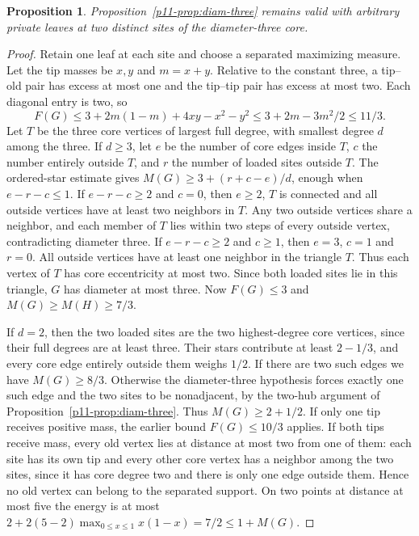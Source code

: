 \documentclass[11pt,a4paper]{article}
\newtheorem{proposition}[theorem]{Proposition}
\begin{document}
\begin{proposition}\label{p11-prop:diam-three-two}
Proposition~\ref{p11-prop:diam-three} remains valid with arbitrary
private leaves at two distinct sites of the diameter-three core.
\end{proposition}
\begin{proof}
Retain one leaf at each site and choose a separated maximizing measure.
Let the tip masses be $x,y$ and $m=x+y$. Relative to the constant
three, a tip--old pair has excess at most one and the tip--tip pair
has excess at most two. Each diagonal entry is two, so
\[
 F(G)\le3+2m(1-m)+4xy-x^2-y^2
      \le3+2m-3m^2/2\le11/3.
\]
Let $T$ be the three core vertices of largest full degree, with smallest
degree $d$ among the three. If $d\ge3$, let $e$ be the number of core
edges inside $T$, $c$ the number entirely outside $T$, and $r$ the
number of loaded sites outside $T$. The ordered-star estimate gives
$M(G)\ge3+(r+c-e)/d$, enough when $e-r-c\le1$.
If $e-r-c\ge2$ and $c=0$, then $e\ge2$, $T$ is connected and
all outside vertices have at least two neighbors in $T$. Any two
outside vertices share a neighbor, and each member of $T$ lies within
two steps of every outside vertex, contradicting diameter three.
If $e-r-c\ge2$ and $c\ge1$, then $e=3$, $c=1$ and $r=0$.
All outside vertices have at least one neighbor in the triangle $T$.
Thus each vertex of $T$ has core eccentricity at most two.
Since both loaded sites lie in this triangle, $G$ has diameter at most
three. Now $F(G)\le3$ and $M(G)\ge M(H)\ge7/3$.

If $d=2$, then the two loaded sites are the two highest-degree core
vertices, since their full degrees are at least three. Their stars
contribute at least $2-1/3$, and every core edge entirely outside them
weighs $1/2$. If there are two such edges we have $M(G)\ge8/3$.
Otherwise the diameter-three hypothesis forces exactly one such edge
and the two sites to be nonadjacent, by the two-hub argument of
Proposition~\ref{p11-prop:diam-three}. Thus $M(G)\ge2+1/2$.
If only one tip receives positive mass, the earlier bound $F(G)\le10/3$
applies. If both tips receive mass, every old vertex lies at distance
at most two from one of them: each site has its own tip and every
other core vertex has a neighbor among the two sites, since it has
core degree two and there is only one edge outside them.
Hence no old vertex can belong to the separated support. On two
points at distance at most five the energy is at most
$2+2(5-2)\max_{0\le x\le1}x(1-x)=7/2\le1+M(G)$.
\end{proof}
\end{document}
